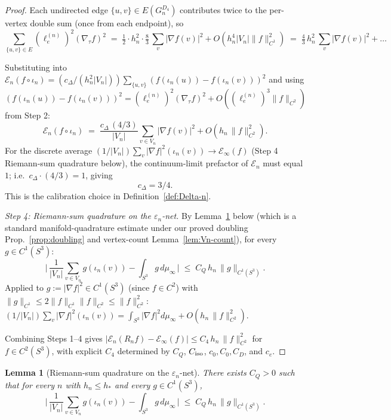 \documentclass[11pt, a4paper]{amsart}
\newtheorem{lemma}[theorem]{Lemma}
\theoremstyle{definition}
\begin{document}
\begin{proof}
Each undirected edge $\{u, v\} \in E(G_n^{D_4})$ contributes
twice to the per-vertex double sum (once from each endpoint),
so
\[
  \sum_{\{u, v\} \in E}(\ell_e^{(n)})^2 (\nabla_\tau f)^2
    \;=\; \tfrac{1}{2} \cdot h_n^2 \cdot \tfrac{8}{3}\,
       \sum_v |\nabla f(v)|^2 + O(h_n^4 |V_n| \|f\|_{C^1}^2)
    \;=\; \tfrac{4}{3}\,h_n^2\,\sum_v |\nabla f(v)|^2 + \ldots
\]

Substituting into $\mathcal E_n(f \circ \iota_n) = (c_\Delta/(h_n^2
|V_n|)) \sum_{\{u, v\}} (f(\iota_n(u)) - f(\iota_n(v)))^2$ and
using $(f(\iota_n(u)) - f(\iota_n(v)))^2 = (\ell_e^{(n)})^2
(\nabla_\tau f)^2 + O((\ell_e^{(n)})^3 \|f\|_{C^2})$ from Step 2:
\[
  \mathcal E_n(f \circ \iota_n) \;=\; \frac{c_\Delta\,(4/3)}{|V_n|}
    \sum_{v \in V_n} |\nabla f(v)|^2 + O(h_n\,\|f\|_{C^2}^2).
\]
For the discrete average $(1/|V_n|)\sum_v |\nabla f|^2(\iota_n(v))
\to \mathcal E_\infty(f)$ (Step 4 Riemann-sum quadrature below),
the continuum-limit prefactor of $\mathcal E_n$ must equal $1$;
i.e.\ $c_\Delta \cdot (4/3) = 1$, giving
\[
  \boxed{c_\Delta = 3/4.}
\]
This is the calibration choice in
Definition~\ref{def:Delta-n}.

\emph{Step 4: Riemann-sum quadrature on the
$\varepsilon_n$-net.} By Lemma~\ref{lem:quadrature} below
(which is a standard manifold-quadrature estimate under our
proved doubling Prop.~\ref{prop:doubling} and vertex-count
Lemma~\ref{lem:Vn-count}), for every $g \in C^1(S^3)$:
\[
  \biggl|\,\frac{1}{|V_n|}\sum_{v \in V_n} g(\iota_n(v))
    - \int_{S^3} g \, d\mu_\infty\,\biggr|
    \;\leq\; C_Q\,h_n\,\|g\|_{C^1(S^3)}.
\]
Applied to $g := |\nabla f|^2 \in C^1(S^3)$ (since
$f \in C^2$) with $\|g\|_{C^1} \leq 2 \|f\|_{C^1} \|f\|_{C^2}
\leq \|f\|_{C^2}^2$:
$(1/|V_n|)\sum_v |\nabla f|^2(\iota_n(v)) = \int_{S^3}
|\nabla f|^2 d\mu_\infty + O(h_n\,\|f\|_{C^2}^2)$.

Combining Steps 1--4 gives
$|\mathcal E_n(R_n f) - \mathcal E_\infty(f)| \leq C_4\,h_n\,
\|f\|_{C^2}^2$ for $f \in C^2(S^3)$, with explicit $C_4$
determined by $C_Q$, $C_{\rm iso}$, $c_0, C_0, C_D$, and $c_e$.
\end{proof}

\begin{lemma}[Riemann-sum quadrature on the $\varepsilon_n$-net]
\label{lem:quadrature}
There exists $C_Q > 0$ such that for every $n$ with $h_n \leq
h_\ast$ and every $g \in C^1(S^3)$,
\[
  \biggl|\,\frac{1}{|V_n|}\sum_{v \in V_n} g(\iota_n(v))
    - \int_{S^3} g \, d\mu_\infty\,\biggr|
    \;\leq\; C_Q\,h_n\,\|g\|_{C^1(S^3)}.
\]
\end{lemma}
\end{document}
